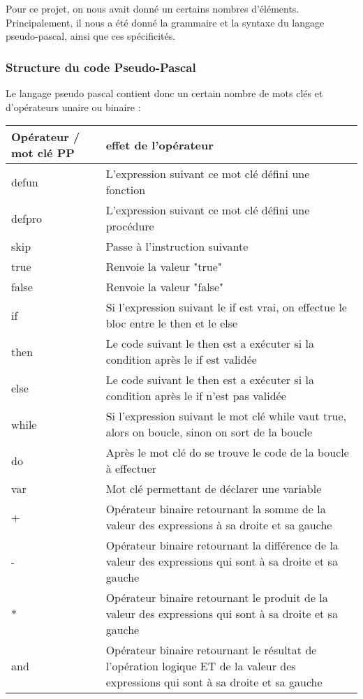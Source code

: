 \documentclass{article}
\begin{document}
Pour ce projet, on nous avait donné un certains nombres d'éléments. Principalement, il nous a été donné la grammaire et la syntaxe du langage pseudo-pascal, ainsi que ces spécificités.

\subsubsection{Structure du code Pseudo-Pascal}

Le langage pseudo pascal contient donc un certain nombre de mots clés et d'opérateurs unaire ou binaire :

\begin{tabular}{|p{2cm}|p{11cm}|}
  \hline
  Opérateur / mot clé PP  & effet de l'opérateur \\
  \hline
  \hline
  defun & L'expression suivant ce mot clé défini une fonction\\ \hline
  defpro & L'expression suivant ce mot clé défini une procédure\\ \hline
  skip & Passe à l'instruction suivante\\ \hline
  true & Renvoie la valeur "true" \\ \hline
  false & Renvoie la valeur "false" \\ \hline
  if & Si l'expression suivant le if est vrai, on effectue le bloc entre le then et le else\\ \hline
  then & Le code suivant le then est a exécuter si la condition après le if est validée\\ \hline
  else & Le code suivant le then est a exécuter si la condition après le if n'est pas validée\\ \hline
  while & Si l'expression suivant le mot clé while vaut true, alors on boucle, sinon on sort de la boucle\\ \hline
  do & Après le mot clé do se trouve le code de la boucle à effectuer\\ \hline
  var & Mot clé permettant de déclarer une variable \\ \hline
  + & Opérateur binaire retournant la somme de la valeur des expressions à sa droite et sa gauche\\ \hline
  - & Opérateur binaire retournant la différence de la valeur des expressions qui sont à sa droite et sa gauche\\ \hline
  * & Opérateur binaire retournant le produit de la valeur des expressions qui sont à sa droite et sa gauche\\ \hline
  and & Opérateur binaire retournant le résultat de l'opération logique ET de la valeur des expressions qui sont à sa droite et sa gauche\\ \hline

\end{tabular}
\end{document}
